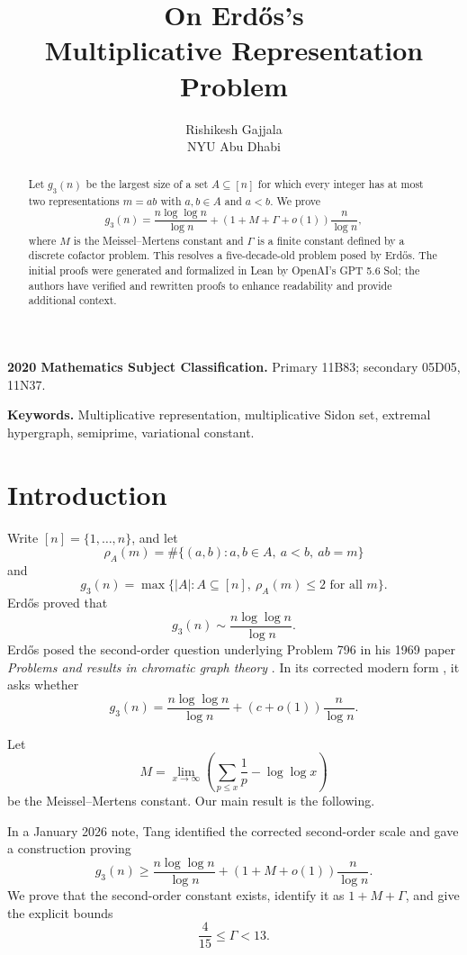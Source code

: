\documentclass[11pt,reqno]{article}
\title{\bfseries On Erd\H{o}s's\\
Multiplicative Representation Problem}
\author{Rishikesh Gajjala\\[2pt]
\small NYU Abu Dhabi}
\date{}
\theoremstyle{definition}
\begin{document}
\maketitle
\thispagestyle{plain}

\begin{abstract}
Let \(g_3(n)\) be the largest size of a set \(A\subseteq[n]\) for which every
integer has at most two representations \(m=ab\) with \(a,b\in A\) and
\(a<b\).
We prove
\[
  g_3(n)
  =\frac{n\log\log n}{\log n}
   +\left(1+M+\Gamma+o(1)\right)\frac{n}{\log n},
\]
where \(M\) is the Meissel--Mertens constant and \(\Gamma\) is a finite
constant defined by a discrete cofactor problem.  This resolves a
five-decade-old problem posed by Erd\H{o}s. The initial proofs were generated
and formalized in Lean by OpenAI's GPT 5.6 Sol; the authors have verified and
rewritten proofs to enhance readability and provide additional context.
\end{abstract}

\medskip
\noindent\textbf{2020 Mathematics Subject Classification.}
Primary 11B83; secondary 05D05, 11N37.

\smallskip
\noindent\textbf{Keywords.}
Multiplicative representation, multiplicative Sidon set, extremal
hypergraph, semiprime, variational constant.

\section{Introduction}

Write \([n]=\{1,\ldots,n\}\), and let
\[
  \rho_A(m)=\#\{(a,b):a,b\in A,\ a<b,\ ab=m\}
\]
and
\[
  g_3(n)=\max\{|A|:A\subseteq[n],\ \rho_A(m)\leq2\text{ for all }m\}.
\]
Erd\H{o}s proved \cite{Erdos1964Multiplicative} that
\[
  g_3(n)\sim\frac{n\log\log n}{\log n}.
\]
Erd\H{o}s posed the second-order question underlying Problem 796 in his
1969 paper \emph{Problems and results in chromatic graph theory}
\cite{Erdos1969Chromatic}.  In its corrected modern form
\cite{BloomErdos796}, it asks whether
\[
  g_3(n)=\frac{n\log\log n}{\log n}
  +(c+o(1))\frac{n}{\log n}.
\]

Let
\[
  M=\lim_{x\to\infty}
  \left(\sum_{p\leq x}\frac1p-\log\log x\right)
\]
be the Meissel--Mertens constant.  Our main result is the following.

In a January 2026 note, Tang \cite{Tang2026Erdos796} identified the corrected
second-order scale and gave a construction proving
\[
  g_3(n)\geq\frac{n\log\log n}{\log n}
  +(1+M+o(1))\frac n{\log n}.
\]
We prove that the second-order constant exists, identify it as
\(1+M+\Gamma\), and give the explicit bounds
\[
  \frac4{15}\leq\Gamma<13.
\]
\end{document}
